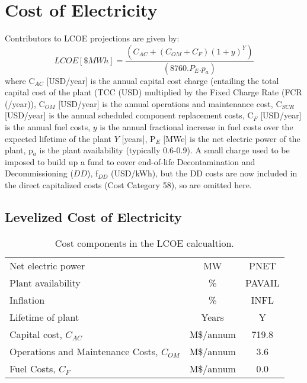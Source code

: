 \newpage 

\section{Cost of Electricity} 

 Contributors to LCOE projections are given by: 
 \begin{equation} 
 LCOE [\$ MWh] = \frac{(C_{AC} + (C_{OM} + C_{F})(1+y)^Y)}{(8760.P_E.p_a)} 
 \label{eq:coe}
\end{equation} 
where C$_{AC}$ [USD/year] is the annual capital cost charge (entailing the total capital cost of the plant (TCC (USD) multiplied by the Fixed Charge Rate (FCR (/year)), C$_{OM}$ [USD/year] is the annual operations and maintenance cost, C$_{SCR}$ [USD/year] is the annual scheduled component replacement costs, C$_{F}$ [USD/year] is the annual fuel costs, $y$ is the annual fractional increase in fuel costs over the expected lifetime of the plant $Y$ [years], P$_{E}$ [MWe] is the net electric power of the plant, p$_{a}$ is the plant availability (typically 0.6-0.9).  A small charge used to be imposed to build up a fund to cover end-of-life Decontamination and Decommissioning ($DD$), f$_{DD}$ (USD/kWh), but the DD costs are now included in the direct capitalized costs (Cost Category 58), so are omitted here.





\subsection{Levelized Cost of Electricity} 

\begin{table}[h!] 
\begin{tabular}{l c c } 
Net electric power & MW & PNET \\
Plant availability & \% & PAVAIL \\
Inflation & \% & INFL \\
Lifetime of plant & Years & Y \\
Capital cost, $C_{AC}$ &     M\$/annum    &    719.8      \\ 
Operations and Maintenance Costs, $C_{OM}$ & M\$/annum  &      3.6 \\ 
Fuel Costs, $C_{F}$ & M\$/annum  &       0.0 \\ 
    \end{tabular} 
    \caption{Cost components in the LCOE calcualtion.}
    \label{tab:lcoe} 
\end{table} 

